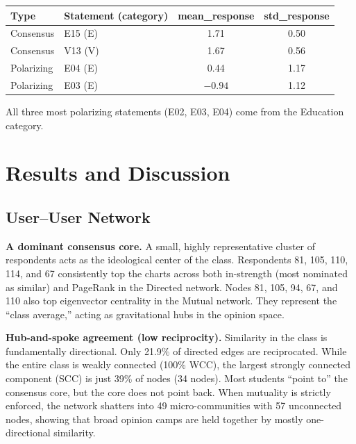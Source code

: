 \documentclass[11pt]{article}
\begin{document}
\begin{center}
\small
\begin{tabular}{llcc}
\toprule
\textbf{Type} & \textbf{Statement (category)} & \textbf{mean\_response} & \textbf{std\_response} \\
\midrule
Consensus & E15 (E) & 1.71 & 0.50 \\
Consensus & V13 (V) & 1.67 & 0.56 \\
Polarizing & E04 (E) & 0.44 & 1.17 \\
Polarizing & E03 (E) & $-0.94$ & 1.12 \\
\bottomrule
\end{tabular}
\end{center}

All three most polarizing statements (E02, E03, E04) come from the Education category.

\section{Results and Discussion}

\subsection{User--User Network}

\textbf{A dominant consensus core.} A small, highly representative cluster of
respondents acts as the ideological center of the class. Respondents 81, 105, 110, 114,
and 67 consistently top the charts across both in-strength (most nominated as similar)
and PageRank in the Directed network. Nodes 81, 105, 94, 67, and 110 also top eigenvector
centrality in the Mutual network. They represent the ``class average,'' acting as
gravitational hubs in the opinion space.

\textbf{Hub-and-spoke agreement (low reciprocity).} Similarity in the class is
fundamentally directional. Only 21.9\% of directed edges are reciprocated. While the
entire class is weakly connected (100\% WCC), the largest strongly connected component
(SCC) is just 39\% of nodes (34 nodes). Most students ``point to'' the consensus core,
but the core does not point back. When mutuality is strictly enforced, the network
shatters into 49 micro-communities with 57 unconnected nodes, showing that broad opinion
camps are held together by mostly one-directional similarity.
\end{document}
